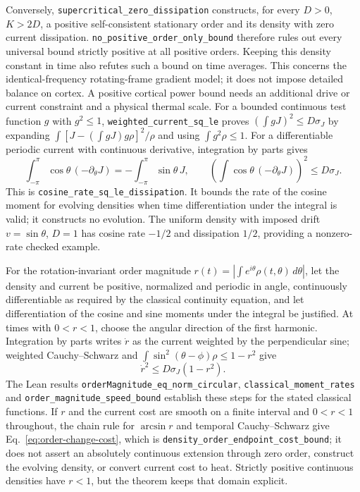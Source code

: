 \documentclass{article}
\begin{document}
Conversely, \nolinkurl{supercritical_zero_dissipation}
constructs, for every $D>0$, $K>2D$, a positive self-consistent stationary
order and its density with zero current dissipation.
\nolinkurl{no_positive_order_only_bound}
therefore rules out every universal bound strictly positive at all positive
orders. Keeping this density constant in time also refutes such a bound on
time averages. This concerns the identical-frequency rotating-frame gradient
model; it does not impose detailed balance on cortex. A positive cortical
power bound needs an additional drive or current constraint and a physical
thermal scale. For a bounded continuous test function $g$ with $g^2\leq1$,
\nolinkurl{weighted_current_sq_le}
proves $(\int gJ)^2\leq D\sigma_J$ by expanding
$\int[J-(\int gJ)g\rho]^2/\rho$ and using $\int g^2\rho\leq1$.
For a differentiable periodic current with continuous derivative, integration
by parts gives
\[
 \int_{-\pi}^{\pi}\cos\theta\,(-\partial_\theta J)
 =-\int_{-\pi}^{\pi}\sin\theta\,J,\qquad
 \left(\int\cos\theta\,(-\partial_\theta J)\right)^2\leq D\sigma_J.
\]
This is \nolinkurl{cosine_rate_sq_le_dissipation}.
It bounds the rate of the cosine moment for evolving densities when time
differentiation under the integral is valid; it constructs no evolution.
The uniform density with imposed drift $v=\sin\theta$, $D=1$ has cosine rate
$-1/2$ and dissipation $1/2$, providing a nonzero-rate checked example.

For the rotation-invariant order magnitude
$r(t)=|\int e^{i\theta}\rho(t,\theta)\,d\theta|$, let the density and current
be positive, normalized and periodic in angle, continuously differentiable
as required by the classical continuity equation, and let differentiation of
the cosine and sine moments under the integral be justified. At times with
$0<r<1$, choose the angular direction of the first harmonic. Integration by
parts writes $\dot r$ as the current weighted by the perpendicular sine;
weighted Cauchy--Schwarz and
$\int\sin^2(\theta-\phi)\rho\leq1-r^2$ give
\[
 \dot r^2\leq D\sigma_J(1-r^2).
\]
The Lean results \nolinkurl{orderMagnitude_eq_norm_circular},
\nolinkurl{classical_moment_rates} and
\nolinkurl{order_magnitude_speed_bound} establish these steps for the stated
classical functions. If $r$ and the current cost are smooth on a finite
interval and $0<r<1$ throughout, the chain rule for $\arcsin r$ and temporal
Cauchy--Schwarz give Eq.~\eqref{eq:order-change-cost}, which is
\nolinkurl{density_order_endpoint_cost_bound}; it does not assert an
absolutely continuous extension through zero order, construct the evolving
density, or convert current cost to heat. Strictly positive continuous
densities have $r<1$, but the theorem keeps that domain explicit.
\end{document}
